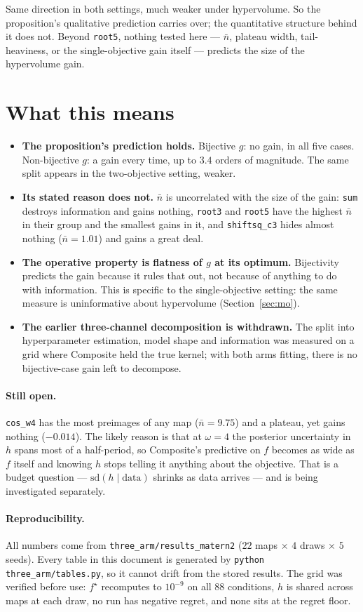 \documentclass[11pt]{article}
\begin{document}
\noindent Same direction in both settings, much weaker under hypervolume. So
the proposition's qualitative prediction carries over; the quantitative
structure behind it does not. Beyond \texttt{root5}, nothing tested here ---
$\bar n$, plateau width, tail-heaviness, or the single-objective gain itself
--- predicts the size of the hypervolume gain.

\section{What this means}

\begin{itemize}\itemsep3pt
\item \textbf{The proposition's prediction holds.} Bijective $g$: no gain, in
all five cases. Non-bijective $g$: a gain every time, up to $3.4$ orders of
magnitude. The same split appears in the two-objective setting, weaker.
\item \textbf{Its stated reason does not.} $\bar n$ is uncorrelated with the
size of the gain: \texttt{sum} destroys information and gains nothing,
\texttt{root3} and \texttt{root5} have the highest $\bar n$ in their group
and the smallest gains in it, and \texttt{shiftsq\_c3} hides almost nothing
($\bar n=1.01$) and gains a great deal.
\item \textbf{The operative property is flatness of $g$ at its optimum.}
Bijectivity predicts the gain because it rules that out, not because of
anything to do with information. This is specific to the single-objective
setting: the same measure is uninformative about hypervolume
(Section~\ref{sec:mo}).
\item \textbf{The earlier three-channel decomposition is withdrawn.} The
split into hyperparameter estimation, model shape and information was measured
on a grid where Composite held the true kernel; with both arms fitting, there
is no bijective-case gain left to decompose.
\end{itemize}

\paragraph{Still open.} \texttt{cos\_w4} has the most preimages of any map
($\bar n=9.75$) and a plateau, yet gains nothing ($-0.014$). The likely reason
is that at $\omega=4$ the posterior uncertainty in $h$ spans most of a
half-period, so Composite's predictive on $f$ becomes as wide as $f$ itself
and knowing $h$ stops telling it anything about the objective. That is a
budget question --- $\mathrm{sd}(h\mid\text{data})$ shrinks as data arrives
--- and is being investigated separately.

\paragraph{Reproducibility.} All numbers come from
\texttt{three\_arm/results\_matern2} ($22$ maps $\times$ $4$ draws $\times$ $5$
seeds). Every table in this document is generated by
\texttt{python three\_arm/tables.py}, so it cannot drift from the stored
results. The grid was verified before use: $f^\star$ recomputes to $10^{-9}$
on all $88$ conditions, $h$ is shared across maps at each draw, no run has
negative regret, and none sits at the regret floor.
\end{document}
